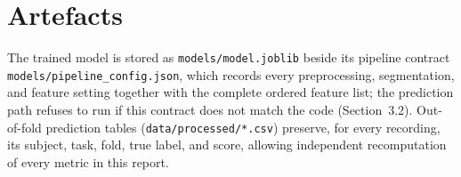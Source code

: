 \section{Artefacts}

The trained model is stored as \texttt{models/model.joblib} beside its
pipeline contract \texttt{models/pipeline\_config.json}, which records
every preprocessing, segmentation, and feature setting together with
the complete ordered feature list; the prediction path refuses to run
if this contract does not match the code (Section~3.2). Out-of-fold
prediction tables (\texttt{data/processed/*.csv}) preserve, for every
recording, its subject, task, fold, true label, and score, allowing
independent recomputation of every metric in this report.

